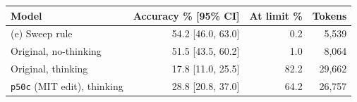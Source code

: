 \begin{tabular}{lrrr}
\toprule
\textbf{Model} & \textbf{Accuracy \% [95\% CI]} & \textbf{At limit \%} & \textbf{Tokens} \\
\midrule
(e) Sweep rule & 54.2 [46.0, 63.0] & 0.2 & 5{,}539 \\
Original, no-thinking & 51.5 [43.5, 60.2] & 1.0 & 8{,}064 \\
Original, thinking & 17.8 [11.0, 25.5] & 82.2 & 29{,}662 \\
\texttt{p50c} (MIT edit), thinking & 28.8 [20.8, 37.0] & 64.2 & 26{,}757 \\
\bottomrule
\end{tabular}
